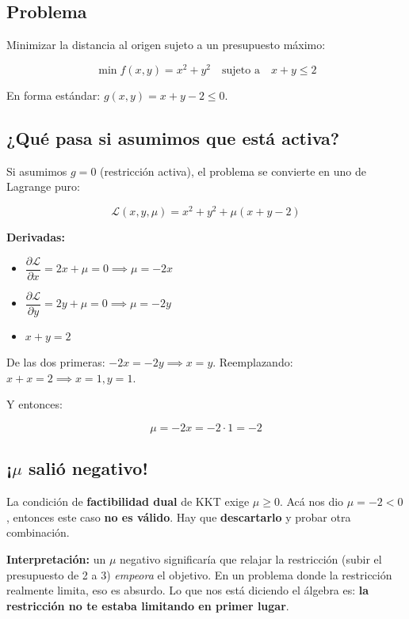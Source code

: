 \documentclass[12pt]{article}
\begin{document}
\subsection{Problema}

Minimizar la distancia al origen sujeto a un presupuesto máximo:

\[
\min f(x, y) = x^2 + y^2 \quad \text{sujeto a} \quad x + y \leq 2
\]

En forma estándar: $g(x, y) = x + y - 2 \leq 0$.

\subsection{¿Qué pasa si asumimos que está activa?}

Si asumimos $g = 0$ (restricción activa), el problema se convierte en uno de Lagrange puro:

\[
\mathcal{L}(x, y, \mu) = x^2 + y^2 + \mu(x + y - 2)
\]

\vspace{0.3em}

\textbf{Derivadas:}

\begin{itemize}
    \item $\dfrac{\partial \mathcal{L}}{\partial x} = 2x + \mu = 0 \implies \mu = -2x$
    \item $\dfrac{\partial \mathcal{L}}{\partial y} = 2y + \mu = 0 \implies \mu = -2y$
    \item $x + y = 2$
\end{itemize}

\vspace{0.3em}

De las dos primeras: $-2x = -2y \implies x = y$. Reemplazando: $x + x = 2 \implies x = 1, y = 1$.

Y entonces:

\[
\mu = -2x = -2 \cdot 1 = -2
\]

\subsection{¡$\mu$ salió negativo!}

La condición de \textbf{factibilidad dual} de KKT exige $\mu \geq 0$. Acá nos dio $\mu = -2 < 0$, entonces este caso \textbf{no es válido}. Hay que \textbf{descartarlo} y probar otra combinación.

\vspace{0.5em}

\textbf{Interpretación:} un $\mu$ negativo significaría que relajar la restricción (subir el presupuesto de 2 a 3) \textit{empeora} el objetivo. En un problema donde la restricción realmente limita, eso es absurdo. Lo que nos está diciendo el álgebra es: \textbf{la restricción no te estaba limitando en primer lugar}.
\end{document}

